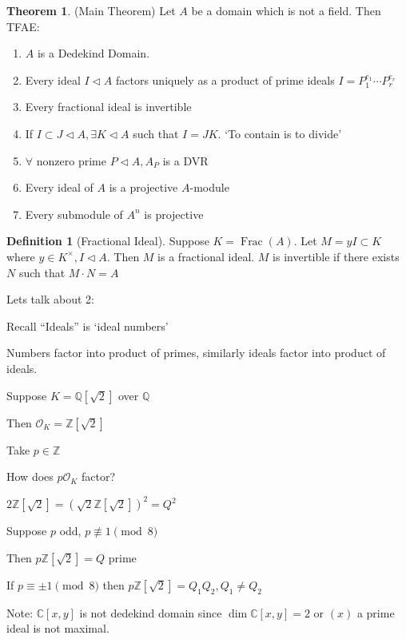 \documentclass{article}
\theoremstyle{definition}
\newtheorem{definition}{Definition}
\newtheorem{theorem}{Theorem}
\newcommand{\Frac}{\operatorname{Frac}}
\begin{document}
\begin{theorem}
    (Main Theorem) Let \(A\) be a domain which is not a field. Then TFAE:

    \begin{enumerate}
        \item \(A\) is a Dedekind Domain.
        \item Every ideal \(I \triangleleft A\) factors uniquely as a product of prime ideals \(I = P_1^{e_1}\cdots P_r^{e_r}\) 
        \item Every fractional ideal is invertible
        \item If \(I \subset J \triangleleft A, \exists K \triangleleft A\) such that \(I = JK\). `To contain is to divide'
        \item \(\forall\) nonzero prime \(P \triangleleft A, A_P\) is a DVR 
        \item Every ideal of \(A\) is a projective \(A\)-module 
        \item Every submodule of \(A^n\) is projective 
    \end{enumerate}
\end{theorem}

\begin{definition}
    [Fractional Ideal] Suppose \(K = \Frac(A)\). Let \(M = yI \subset K\) where \(y\in K^\times, I \triangleleft A\). Then \(M\) is a fractional ideal. \(M\) is invertible if there exists \(N\) such that \(M\cdot N = A\)    
\end{definition}

Lets talk about 2:

Recall ``Ideals'' is `ideal numbers'

Numbers factor into product of primes, similarly ideals factor into product of ideals.

Suppose \(K = \mathbb{Q} [\sqrt{2}]\) over \(\mathbb{Q}\)

Then \(\mathcal{O}_K = \mathbb{Z} [\sqrt{2}]\) 

Take \(p\in\mathbb{Z}\)

How does \(p \mathcal{O}_K\) factor?

\(2\mathbb{Z} [\sqrt{2}]=(\sqrt{2}\mathbb{Z}[\sqrt{2}])^2 = Q^2\) 

Suppose \(p\) odd, \(p \not\equiv 1\pmod 8\)

Then \(p \mathbb{Z} [\sqrt{2}] = Q\) prime

If \(p \equiv \pm 1\pmod 8\) then \(p\mathbb{Z} [\sqrt{2}]=Q_1 Q_2, Q_1\neq Q_2\)  

Note: \(\mathbb{C}[x,y]\) is not dedekind domain since \(\dim \mathbb{C} [x,y]=2\) or \((x)\) a prime ideal is not maximal.
\end{document}

